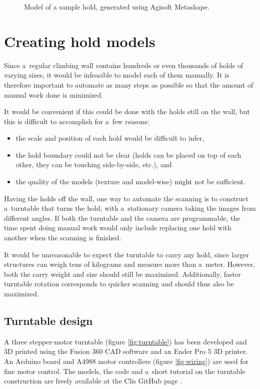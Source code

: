 \begin{figure}[b]
	\centering
	\hfill
	\caption{Model of a sample hold, generated using Agisoft Metashape.}%
\end{figure}

\section{Creating hold models}
Since a~regular climbing wall contains hundreds or even thousands of holds of varying sizes, it would be infeasible to model each of them manually.
It is therefore important to automate as many steps as possible so that the amount of manual work done is minimized.

It would be convenient if this could be done with the holds still on the wall, but this is difficult to accomplish for a~few reasons:
\begin{itemize}
	\item the scale and position of each hold would be difficult to infer,
	\item the hold boundary could not be clear (holds can be placed on top of each other, they can be touching side-by-side, etc.), and
	\item the quality of the models (texture and model-wise) might not be sufficient.
\end{itemize}

Having the holds off the wall, one way to automate the scanning is to construct a~turntable that turns the hold, with a~stationary camera taking the images from different angles.
If both the turntable and the camera are programmable, the time spent doing manual work would only include replacing one hold with another when the scanning is finished.

It would be unreasonable to expect the turntable to carry any hold, since larger structures can weigh tens of kilograms and measure more than a~meter.
However, both the carry weight and size should still be maximized.
Additionally, faster turntable rotation corresponds to quicker scanning and should thus also be maximized.

\subsection{Turntable design}
A three stepper-motor turntable (figure \ref{fig:turntable}) has been developed and 3D printed using the Fusion 360 CAD software \cite{fusion} and an Ender Pro 5 3D printer.
An Arduino board and A4988 motor controllers (figure \ref{fig:wiring}) are used for fine motor control.
The models, the code and a~short tutorial on the turntable construction are freely available at the Clis GitHub page \cite{clis}.

